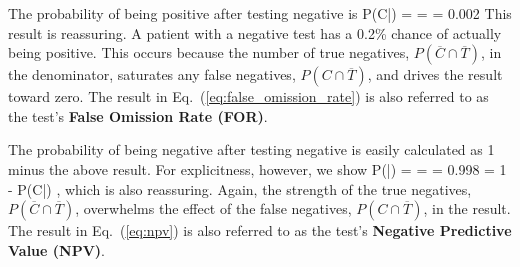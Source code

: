 The probability of being positive after testing negative is 
\be
 P(C|) = \dst{} = 
  = 
 0.002 
 \label{eq:false_omission_rate}
\ee
This result is reassuring.  A patient with a negative test has a 0.2\% chance of 
actually being positive.  This occurs because the number of true negatives, 
$P(\overline{C} \cap \overline{T})$, in the denominator, saturates any false negatives, 
$P(C \cap \overline{T})$, and drives the result toward zero.  The result 
in Eq.~(\ref{eq:false_omission_rate}) is also 
referred to as the test's
{\bf False Omission Rate (FOR)}.

The probability of being negative after testing negative is easily calculated as 
1 minus the above result.  For explicitness, however, we show
\be
 P(|) = 
 \dst{} = 
  = 
 0.998 = 1 - P(C|) \mbox{}, 
 \label{eq:npv}
\ee
which is also reassuring.  Again, the strength of the true negatives, 
$P(\overline{C} \cap \overline{T})$,  overwhelms the 
effect of the false negatives, $P(C \cap \overline{T})$, in the result.
The result in Eq.~(\ref{eq:npv}) is also referred 
to as the test's 
{\bf Negative Predictive Value (NPV)}.  

